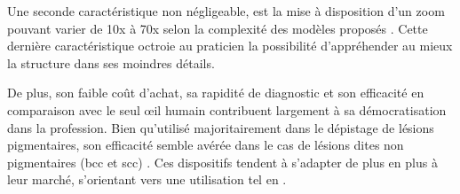 Une seconde caractéristique non négligeable, est la mise à disposition d’un zoom pouvant varier de 10x à 70x selon la complexité des modèles proposés \cite{Campos-do-Carmo2008}. Cette dernière caractéristique octroie au praticien la possibilité d’appréhender au mieux la structure dans ses moindres détails.\par

De plus, son faible coût d’achat, sa rapidité de diagnostic et son efficacité en comparaison avec le seul œil humain \cite{Lallas2013} contribuent largement  à sa démocratisation dans la profession. Bien qu’utilisé majoritairement dans le dépistage de lésions pigmentaires, son efficacité semble avérée dans le cas de lésions dites non pigmentaires (\gls{bcc} et \gls{scc}) \cite{Lallas2013}. Ces dispositifs tendent à s'adapter de plus en plus à leur marché, s'orientant vers une utilisation tel en .\par

